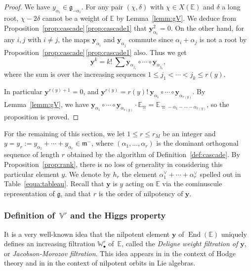 \documentclass[JEP,XML,SOM,Unicode,NoFloatCountersInSection]{cedram}
\let\oldvee\vee
\renewcommand{\vee}{{\scriptscriptstyle\oldvee}}
\newcommand{\sbullet}{{\scriptscriptstyle\bullet}}
\newcommand{\citestar}[3]{\cite[#3]{#1}}
\theoremstyle{plain}
\theoremstyle{definition}
\let\rgy r
\DeclareMathOperator{\End}{End}
\newcommand{\bE}{\mathbb{E}}
\newcommand{\Vr}{\mathbb{V}^\rgy}
\newcommand{\Wr}{\mathbb{W}^\rgy}
\newcommand{\by}{\boldsymbol{y}}
\newcommand{\fgg}{\mathfrak{g}}
\newcommand{\fm}{\mathfrak{m}}
\newcommand{\rkm}{{r_M}}
\newcommand{\rky}{{r(y)}}
\begin{document}
\begin{proof}
We have $y_{\alpha_i} \in \fgg_{-\alpha_i}$. For any pair $(\chi,\delta)$ with $\chi \in X(\bE)$ and
$\delta$ a long root,
$\chi-2\delta$ cannot be a weight of $\bE$ by Lemma~\ref{lemm:gV}. We deduce from
Proposition~\ref{prop:cascade}\,\eqref{prop:cascade1}
that
$\by_{\alpha_i}^2=0$. On the other hand, for any $i,j$ with $i \neq j$,
the maps $\by_{\alpha_i}$ and $\by_{\alpha_j}$ commute since $\alpha_i + \alpha_j$ is not
a root by Proposition~\ref{prop:cascade}\,\eqref{prop:cascade1} also. Thus we get
$$
\by^k = k!\ \sum \by_{\alpha_{j_1}} \circ \cdots \circ \by_{\alpha_{j_k}},
$$
where the sum is over the increasing sequences $1\leq j_1 < \cdots < j_k \leq \rky$.

In particular $\by^{\rky+1} = 0$, and
$\by^\rky = \rky!\ \by_{\alpha_1} \circ \cdots \circ \by_{\alpha_\rky}$.
By Lemma~\ref{lemm:gV}, we have
$\by_{\alpha_1} \circ \cdots \circ \by_{\alpha_\rky} \cdot \bE_{\varpi} = \bE_{\varpi-\alpha_1-\cdots-\alpha_\rky}$,
so the proposition is proved.
\end{proof}

For the remaining of this section, we let $1\leq \rgy \leq \rkm$ be an integer and $y=y_r:=y_{\alpha_1}+
\cdots + y_{\alpha_\rgy}\in\fm^-$, where
$(\alpha_1,\ldots,\alpha_\rgy)$ is the dominant orthogonal sequence of length $\rgy$ obtained by the
algorithm of Definition~\ref{def:cascade}. By Proposition~\ref{prop:rank}, there is no loss of
generality in considering this particular element $y$.
We denote by
$h_\rgy$ the element
$\alpha_1^\vee + \cdots + \alpha_\rgy^\vee$ spelled out in Table~\ref{equa:tableau}. Recall that $\by$
is $y$ acting on $\bE$ via the cominuscule representation of $\fgg$, and that $r$ is the order
of nilpotency of $\by$.

\subsubsection{Definition of $\,\Vr$ and the Higgs property}

It is a very well-known idea that the nilpotent element $\by$ of $\End(\bE)$ uniquely defines an increasing
filtration $\Wr_\sbullet$ of~$\bE$, called the \emph{Deligne weight filtration of $\by$}, or
\emph{Jacobson-Morozov filtration}. This idea appears in \citestar{deligne}*{.13} in the context of
Hodge theory and in \citestar{mcgovern}*{\S\S3.2\,\&\,3.4} in the context of nilpotent orbits in Lie algebras.
\end{document}
